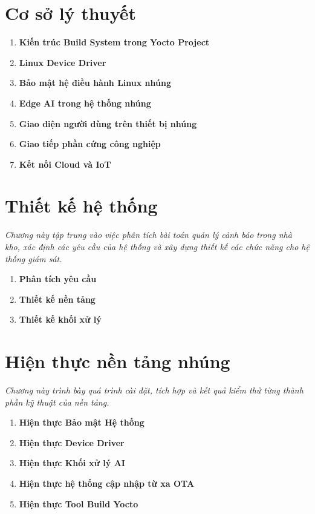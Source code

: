 \documentclass[a4paper,12pt]{report}
\begin{document}
\chapter{Cơ sở lý thuyết}
\begin{enumerate}[
    leftmargin=2.5em,
    labelsep=0.8em,
    itemsep=0.6em
]
  \renewcommand{\labelenumi}{\textcolor{chaptercolor}{\bfseries \thechapter.\arabic{enumi}}}
  \item \textbf{Kiến trúc Build System trong Yocto Project}
  \item \textbf{Linux Device Driver}
  \item \textbf{Bảo mật hệ điều hành Linux nhúng}
  \item \textbf{Edge AI trong hệ thống nhúng}
  \item \textbf{Giao diện người dùng trên thiết bị nhúng}
  \item \textbf{Giao tiếp phần cứng công nghiệp}  
  \item \textbf{Kết nối Cloud và IoT}
\end{enumerate}

\newpage


\chapter{Thiết kế hệ thống}
\textcolor{chaptercolor}{\textit{Chương này tập trung vào việc phân tích bài toán quản lý cảnh báo trong nhà kho, xác định các yêu cầu của hệ thống và xây dựng thiết kế các chức năng cho hệ thống giám sát.
}}

\begin{enumerate}[
    leftmargin=2.5em,
    labelsep=0.8em,
    itemsep=0.6em
]
  \renewcommand{\labelenumi}{\textcolor{chaptercolor}{\bfseries \thechapter.\arabic{enumi}}}
  \item \textbf{Phân tích yêu cầu}
  \item \textbf{Thiết kế nền tảng}
  \item \textbf{Thiết kế khối xử lý}
\end{enumerate}
\newpage


\chapter{Hiện thực nền tảng nhúng}
\textcolor{chaptercolor}{\textit{Chương này trình bày quá trình cài đặt, tích hợp và kết quả kiểm thử từng thành phần kỹ thuật của nền tảng.}}

\begin{enumerate}[
    leftmargin=2.5em,
    labelsep=0.8em,
    itemsep=0.6em
]
  \renewcommand{\labelenumi}{\textcolor{chaptercolor}{\bfseries \thechapter.\arabic{enumi}}}
  \item \textbf{Hiện thực Bảo mật Hệ thống}
  \item \textbf{Hiện thực Device Driver}
  \item \textbf{Hiện thực Khối xử lý AI}
  \item \textbf{Hiện thực hệ thống cập nhập từ xa OTA}
  \item \textbf{Hiện thực Tool Build Yocto}
\end{enumerate}
\end{document}
